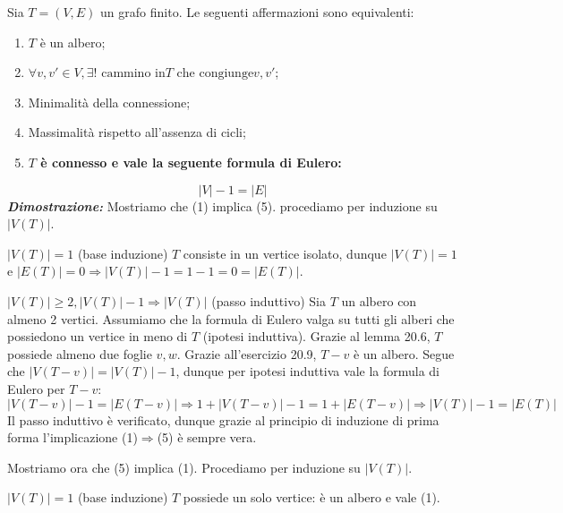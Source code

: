 \documentclass[oneside]{book}
\theoremstyle{remark}
\begin{document}
\begin{tcolorbox}[title={Teorema di caratterizzazione degli alberi finiti mediante la formula di Eulero}]
    Sia $T=(V,E)$ un grafo finito. Le seguenti affermazioni sono equivalenti:
    \begin{enumerate}
        \item $T$ è un albero;
        \item $\forall v,v'\in V,\exists! \text{ cammino in} T \text{ che congiunge} v,v'$;
        \item Minimalità della connessione;
        \item Massimalità rispetto all'assenza di cicli;
        \item \textbf{$T$ è connesso e vale la seguente formula di Eulero:}
    \end{enumerate}
    \[ |V|-1=|E| \]
    \textit{\textbf{Dimostrazione:}} Mostriamo che (1) implica (5). procediamo
    per induzione su $|V(T)|$.

    $|V(T)|=1$ (base induzione) $T$ consiste in un vertice isolato, dunque $|V(T)|=1$ e $|E(T)|=0
    \Longrightarrow |V(T)|-1 = 1-1 = 0 = |E(T)|$.

    $|V(T)|\geq 2, |V(T)|-1\Longrightarrow|V(T)|$ (passo induttivo) Sia $T$ un albero con
    almeno 2 vertici. Assumiamo che la formula di Eulero valga su tutti gli alberi che
    possiedono un vertice in meno di $T$ (ipotesi induttiva). Grazie al lemma 20.6, $T$
    possiede almeno due foglie $v,w$. Grazie all'esercizio 20.9, $T-v$ è un albero.
    Segue che $|V(T-v)|=|V(T)|-1$, dunque per ipotesi induttiva vale la formula di
    Eulero per $T-v$: \[ |V(T-v)|-1=|E(T-v)| \Longrightarrow 1+|V(T-v)| - 1 = 1+|E(T-v)| \Longrightarrow |V(T)|-1=|E(T)| \]
    Il passo induttivo è verificato, dunque grazie al principio di induzione di prima forma
    l'implicazione (1)$\Rightarrow$(5) è sempre vera.

    Mostriamo ora che (5) implica (1). Procediamo per induzione su $|V(T)|$.

    $|V(T)|=1$ (base induzione) $T$ possiede un solo vertice: è un albero e vale (1).


\end{tcolorbox}
\end{document}
